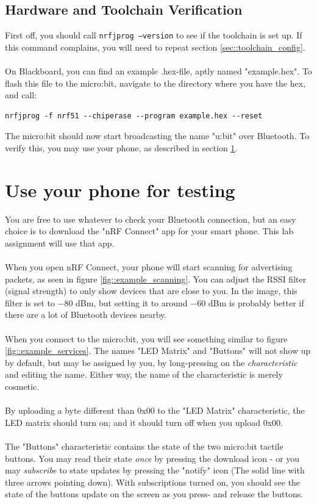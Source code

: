 \documentclass[11pt,a4paper]{article}
\begin{document}
\subsection{Hardware and Toolchain Verification}
First off, you should call \texttt{nrfjprog --version} to see if the toolchain is set up. If this command complains, you will need to repeat section \ref{sec::toolchain_config}.\\
\\
On Blackboard, you can find an example .hex-file, aptly named "example.hex". To flash this file to the micro:bit, navigate to the directory where you have the hex, and call:
\begin{verbatim}
nrfjprog -f nrf51 --chiperase --program example.hex --reset
\end{verbatim}
The micro:bit should now start broadcasting the name "u:bit" over Bluetooth. To verify this, you may use your phone, as described in section \ref{sec::phone_verify}.

\section{Use your phone for testing}
\label{sec::phone_verify}
You are free to use whatever to check your Bluetooth connection, but an easy choice is to download the "nRF Connect" app for your smart phone. This lab assignment will use that app.\\
\\
When you open nRF Connect, your phone will start scanning for advertising packets, as seen in figure \ref{fig::example_scanning}. You can adjust the RSSI filter (signal strength) to only show devices that are close to you. In the image, this filter is set to $-80$ dBm, but setting it to around $-60$ dBm is probably better if there are a lot of Bluetooth devices nearby.\\
\\
When you connect to the micro:bit, you will see something similar to figure \ref{fig::example_services}. The names "LED Matrix" and "Buttons" will not show up by default, but may be assigned by you, by long-pressing on the \textit{characteristic} and editing the name. Either way, the name of the characteristic is merely cosmetic.\\
\\
By uploading a byte different than 0x00 to the "LED Matrix" characteristic, the LED matrix should turn on; and it should turn off when you upload 0x00.\\
\\
The "Buttons" characteristic contains the state of the two micro:bit tactile buttons. You may read their state \textit{once} by pressing the download icon - or you may \textit{subscribe} to state updates by pressing the "notify" icon (The solid line with three arrows pointing down). With subscriptions turned on, you should see the state of the buttons update on the screen as you press- and release the buttons.
\end{document}
